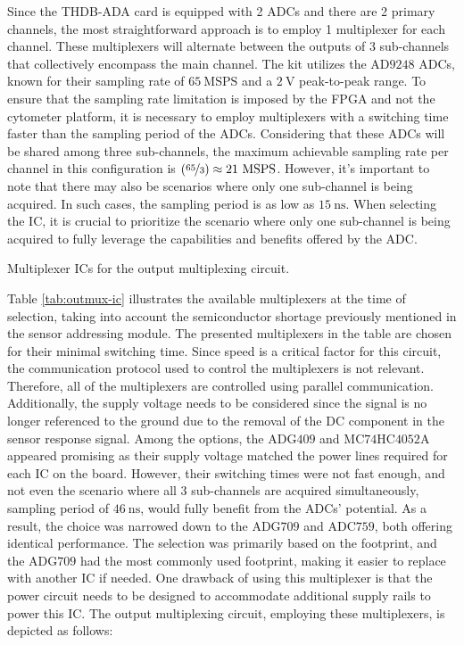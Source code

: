 Since the THDB-ADA card is equipped with 2 \ac{ADC}s and there are 2 primary channels, the most straightforward approach is to employ 1 multiplexer for each channel. These multiplexers will alternate between the outputs of 3 sub-channels that collectively encompass the main channel. The kit utilizes the $\mathrm{AD9248}$ \ac{ADC}s, known for their sampling rate of $\mathrm{65~MSPS}$ and a $\mathrm{2~V}$ peak-to-peak range. To ensure that the sampling rate limitation is imposed by the \ac{FPGA} and not the cytometer platform, it is necessary to employ multiplexers with a switching time faster than the sampling period of the \ac{ADC}s. Considering that these \ac{ADC}s will be shared among three sub-channels, the maximum achievable sampling rate per channel in this configuration is $\left(\nicefrac{65}{3}\right)\approx\mathrm{21~MSPS}$. However, it's important to note that there may also be scenarios where only one sub-channel is being acquired. In such cases, the sampling period is as low as $\mathrm{15~ns}$. When selecting the \ac{IC}, it is crucial to prioritize the scenario where only one sub-channel is being acquired to fully leverage the capabilities and benefits offered by the \ac{ADC}.

\begin{table}[ht]
    \centering
    \caption{Multiplexer ICs for the output multiplexing circuit.}
    \begin{small}
    
    \end{small}
    \label{tab:outmux-ic}
\end{table}

Table \ref{tab:outmux-ic} illustrates the available multiplexers at the time of selection, taking into account the semiconductor shortage previously mentioned in the sensor addressing module. The presented multiplexers in the table are chosen for their minimal switching time. Since speed is a critical factor for this circuit, the communication protocol used to control the multiplexers is not relevant. Therefore, all of the multiplexers are controlled using parallel communication. Additionally, the supply voltage needs to be considered since the signal is no longer referenced to the ground due to the removal of the \ac{DC} component in the sensor response signal. Among the options, the $\mathrm{ADG409}$ and $\mathrm{MC74HC4052A}$ appeared promising as their supply voltage matched the power lines required for each \ac{IC} on the board. However, their switching times were not fast enough, and not even the scenario where all 3 sub-channels are acquired simultaneously, sampling period of $\mathrm{46~ns}$, would fully benefit from the \ac{ADC}s' potential. As a result, the choice was narrowed down to the $\mathrm{ADG709}$ and $\mathrm{ADC759}$, both offering identical performance. The selection was primarily based on the footprint, and the $\mathrm{ADG709}$ had the most commonly used footprint, making it easier to replace with another \ac{IC} if needed. One drawback of using this multiplexer is that the power circuit needs to be designed to accommodate additional supply rails to power this \ac{IC}. The output multiplexing circuit, employing these multiplexers, is depicted as follows:

